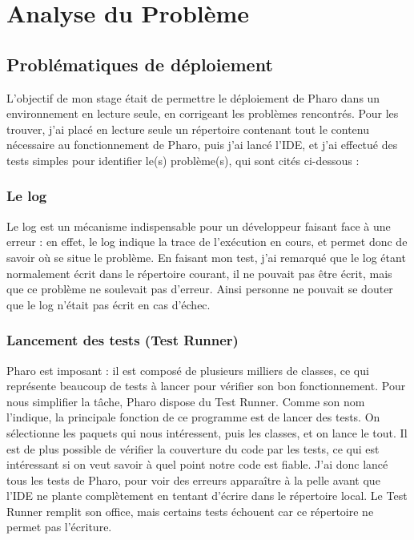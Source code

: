 \section{Analyse du Problème}

\subsection{Problématiques de déploiement}
L'objectif de mon stage était de permettre le déploiement de Pharo dans un environnement en lecture seule, en corrigeant les problèmes rencontrés. Pour les trouver, j'ai placé en lecture seule un répertoire contenant tout le contenu nécessaire au fonctionnement de Pharo, puis j'ai lancé l'IDE, et j'ai effectué des tests simples pour identifier le(s) problème(s), qui sont cités ci-dessous :

\subsubsection{Le log}
Le log est un mécanisme indispensable pour un développeur faisant face à une erreur : en effet, le log indique la trace de l'exécution en cours, et permet donc de savoir où se situe le problème. En faisant mon test, j'ai remarqué que le log étant normalement écrit dans le répertoire courant, il ne pouvait pas être écrit, mais que ce problème ne soulevait pas d'erreur. Ainsi personne ne pouvait se douter que le log n'était pas écrit en cas d'échec.

\subsubsection{Lancement des tests (Test Runner)}
Pharo est imposant : il est composé de plusieurs milliers de classes, ce qui représente beaucoup de tests à lancer pour vérifier son bon fonctionnement. Pour nous simplifier la tâche, Pharo dispose du Test Runner. Comme son nom l'indique, la principale fonction de ce programme est de lancer des tests. On sélectionne les paquets qui nous intéressent, puis les classes, et on lance le tout. Il est de plus possible de vérifier la couverture du code par les tests, ce qui est intéressant si on veut savoir à quel point notre code est fiable. J'ai donc lancé tous les tests de Pharo, pour voir des erreurs apparaître à la pelle avant que l'IDE ne plante complètement en tentant d'écrire dans le répertoire local. Le Test Runner remplit son office, mais certains tests échouent car ce répertoire ne permet pas l'écriture.

